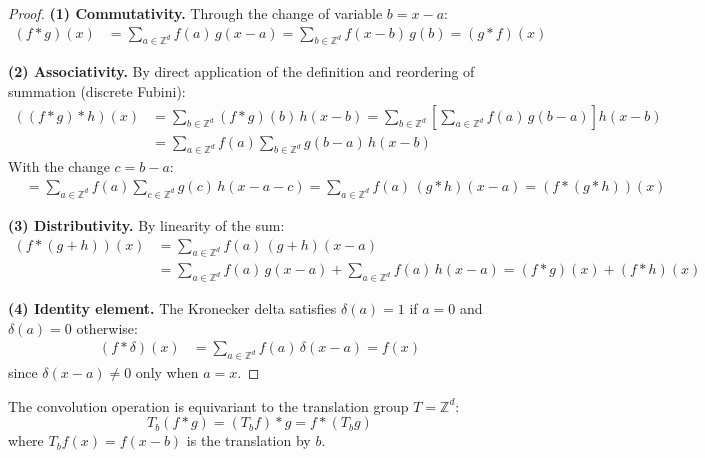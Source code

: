 \begin{proof}
\textbf{(1) Commutativity.} Through the change of variable \(b = x - a\):
\begin{align}
(f * g)(x) &= \sum_{a \in \mathbb{Z}^d} f(a)\,g(x - a) = \sum_{b \in \mathbb{Z}^d} f(x - b)\,g(b) = (g * f)(x)
\end{align}

\textbf{(2) Associativity.} By direct application of the definition and reordering of summation (discrete Fubini):
\begin{align}
((f * g) * h)(x) &= \sum_{b \in \mathbb{Z}^d} (f * g)(b)\,h(x - b) = \sum_{b \in \mathbb{Z}^d} \left[\sum_{a \in \mathbb{Z}^d} f(a)\,g(b - a)\right] h(x - b) \nonumber \\
                  &= \sum_{a \in \mathbb{Z}^d} f(a) \sum_{b \in \mathbb{Z}^d} g(b - a)\,h(x - b)
\end{align}
With the change \(c = b - a\):
\begin{align}
&= \sum_{a \in \mathbb{Z}^d} f(a) \sum_{c \in \mathbb{Z}^d} g(c)\,h(x - a - c) = \sum_{a \in \mathbb{Z}^d} f(a)\,(g * h)(x - a) = (f * (g * h))(x)
\end{align}

\textbf{(3) Distributivity.} By linearity of the sum:
\begin{align}
(f * (g + h))(x) &= \sum_{a \in \mathbb{Z}^d} f(a)\,(g + h)(x - a) \nonumber \\
                  &= \sum_{a \in \mathbb{Z}^d} f(a)\,g(x - a) + \sum_{a \in \mathbb{Z}^d} f(a)\,h(x - a) = (f * g)(x) + (f * h)(x)
\end{align}

\textbf{(4) Identity element.} The Kronecker delta satisfies \(\delta(a) = 1\) if \(a = 0\) and \(\delta(a) = 0\) otherwise:
\begin{align}
(f * \delta)(x) &= \sum_{a \in \mathbb{Z}^d} f(a)\,\delta(x - a) = f(x)
\end{align}
since \(\delta(x - a) \neq 0\) only when \(a = x\).
\end{proof}

\begin{theorem}\label{theorem:convolution_translation_equivariance}
The convolution operation is equivariant to the translation group \(T = \mathbb{Z}^d\):
\[
T_b(f * g) = (T_b f) * g = f * (T_b g)
\]
where \(T_b f(x) = f(x - b)\) is the translation by \(b\).
\end{theorem}

